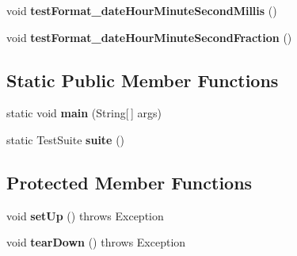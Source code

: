 \begin{DoxyCompactItemize}
\item 
\hypertarget{classorg_1_1joda_1_1time_1_1format_1_1_test_i_s_o_date_time_format_a58ffe4e7bfbb085fbcbda5aada0027b3}{void {\bfseries test\-Format\-\_\-date\-Hour\-Minute\-Second\-Millis} ()}\label{classorg_1_1joda_1_1time_1_1format_1_1_test_i_s_o_date_time_format_a58ffe4e7bfbb085fbcbda5aada0027b3}

\item 
\hypertarget{classorg_1_1joda_1_1time_1_1format_1_1_test_i_s_o_date_time_format_a3be4d7f9702f6250d8fc889936926f22}{void {\bfseries test\-Format\-\_\-date\-Hour\-Minute\-Second\-Fraction} ()}\label{classorg_1_1joda_1_1time_1_1format_1_1_test_i_s_o_date_time_format_a3be4d7f9702f6250d8fc889936926f22}

\end{DoxyCompactItemize}
\subsection*{Static Public Member Functions}
\begin{DoxyCompactItemize}
\item 
\hypertarget{classorg_1_1joda_1_1time_1_1format_1_1_test_i_s_o_date_time_format_a8dee2e843792cbde4a07e15f2b3c106d}{static void {\bfseries main} (String\mbox{[}$\,$\mbox{]} args)}\label{classorg_1_1joda_1_1time_1_1format_1_1_test_i_s_o_date_time_format_a8dee2e843792cbde4a07e15f2b3c106d}

\item 
\hypertarget{classorg_1_1joda_1_1time_1_1format_1_1_test_i_s_o_date_time_format_ac586c27ab65d6ac69033bc090ae2a5ef}{static Test\-Suite {\bfseries suite} ()}\label{classorg_1_1joda_1_1time_1_1format_1_1_test_i_s_o_date_time_format_ac586c27ab65d6ac69033bc090ae2a5ef}

\end{DoxyCompactItemize}
\subsection*{Protected Member Functions}
\begin{DoxyCompactItemize}
\item 
\hypertarget{classorg_1_1joda_1_1time_1_1format_1_1_test_i_s_o_date_time_format_a9dd7d0da1cd43ae33f11bcb22509e951}{void {\bfseries set\-Up} ()  throws Exception }\label{classorg_1_1joda_1_1time_1_1format_1_1_test_i_s_o_date_time_format_a9dd7d0da1cd43ae33f11bcb22509e951}

\item 
\hypertarget{classorg_1_1joda_1_1time_1_1format_1_1_test_i_s_o_date_time_format_a9cfb38afd758949c2a61a057487a069d}{void {\bfseries tear\-Down} ()  throws Exception }\label{classorg_1_1joda_1_1time_1_1format_1_1_test_i_s_o_date_time_format_a9cfb38afd758949c2a61a057487a069d}

\end{DoxyCompactItemize}


